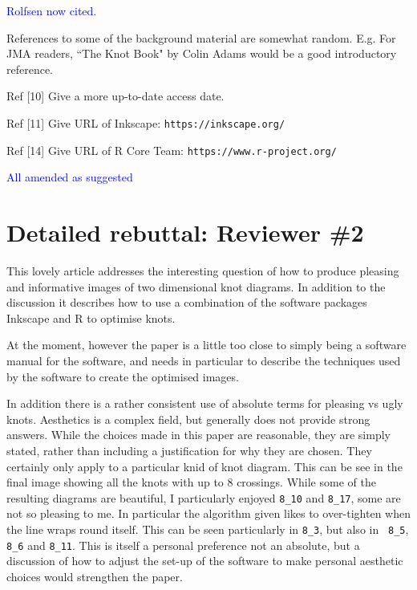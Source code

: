 \documentclass[12pt]{article}
\begin{document}
\textcolor{blue}{Rolfsen now cited.}

References to some of the background material are somewhat random.
E.g.  For JMA readers, ``The Knot Book" by Colin Adams would be a good
introductory reference.

Ref [10]  Give a more up-to-date access date.

Ref [11]  Give URL of  Inkscape:  {\tt https://inkscape.org/}

Ref [14]  Give URL of  R Core Team:  {\tt https://www.r-project.org/}


\textcolor{blue}{All amended as suggested}

\section*{Detailed rebuttal: Reviewer \#2}

This lovely article addresses the interesting question of
how to produce pleasing and informative images of two dimensional knot
diagrams. In addition to the discussion it describes how to use a
combination of the software packages Inkscape and R to optimise knots.

At the moment, however the paper is a little too close to simply being
a software manual for the software, and needs in particular to
describe the techniques used by the software to create the optimised
images.

In addition there is a rather consistent use of absolute terms for
pleasing vs ugly knots. Aesthetics is a complex field, but generally
does not provide strong answers. While the choices made in this paper
are reasonable, they are simply stated, rather than including a
justification for why they are chosen. They certainly only apply to a
particular knid of knot diagram. This can be see in the final image
showing all the knots with up to 8 crossings. While some of the
resulting diagrams are beautiful, I particularly enjoyed {\tt 8\_10}
and {\tt 8\_17}, some are not so pleasing to me. In particular the
algorithm given likes to over-tighten when the line wraps round
itself. This can be seen particularly in {\tt 8\_3}, but also in {\tt
  8\_5}, {\tt 8\_6} and {\tt 8\_11}. This is itself a personal
preference not an absolute, but a discussion of how to adjust the
set-up of the software to make personal aesthetic choices would
strengthen the paper.
\end{document}
